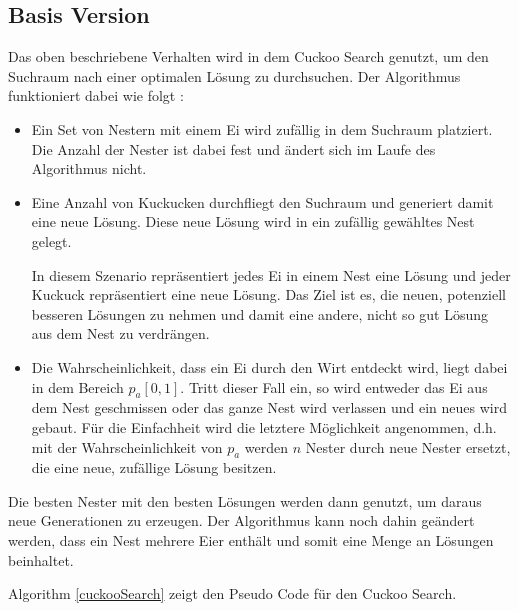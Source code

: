 \documentclass[conference]{IEEEtran}
\begin{document}
    \subsection{Basis Version}
      Das oben beschriebene Verhalten wird in dem Cuckoo Search genutzt, um den Suchraum nach einer optimalen Lösung 
      zu durchsuchen. Der Algorithmus funktioniert dabei wie folgt \cite{b1}:

      \begin{itemize}
        \item Ein Set von Nestern mit einem Ei wird zufällig in dem Suchraum platziert. Die Anzahl der Nester 
          ist dabei fest und ändert sich im Laufe des Algorithmus nicht. 

        \item Eine Anzahl von Kuckucken durchfliegt den Suchraum und generiert damit eine neue Lösung. Diese 
          neue Lösung wird in ein zufällig gewähltes Nest gelegt. 

          In diesem Szenario repräsentiert jedes Ei in einem Nest eine Lösung und jeder Kuckuck repräsentiert eine 
          neue Lösung. Das Ziel ist es, die neuen, potenziell besseren Lösungen zu nehmen und damit eine andere, 
          nicht so gut Lösung aus dem Nest zu verdrängen. 

        \item Die Wahrscheinlichkeit, dass ein Ei durch den Wirt entdeckt wird, liegt dabei in dem Bereich $p_{a}[0,1]$. 
          Tritt dieser Fall ein, so wird entweder das Ei aus dem Nest geschmissen oder das ganze Nest wird verlassen 
          und ein neues wird gebaut. Für die Einfachheit wird die letztere Möglichkeit angenommen, d.h. mit 
          der Wahrscheinlichkeit von $p_{a}$ werden $n$ Nester durch neue Nester ersetzt, die eine neue, zufällige Lösung besitzen. 
      \end{itemize}

      Die besten Nester mit den besten Lösungen werden dann genutzt, um daraus neue Generationen zu erzeugen. 
      Der Algorithmus kann noch dahin geändert werden, dass ein Nest mehrere Eier enthält und somit eine Menge an Lösungen beinhaltet.

      {Algorithm \ref{cuckooSearch}} zeigt den Pseudo Code für den Cuckoo Search. 
\end{document}
